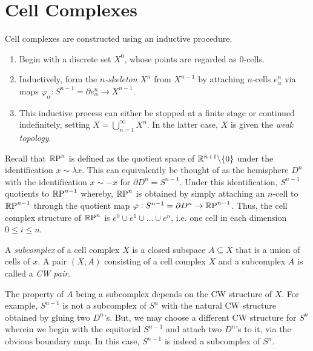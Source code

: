 \section{Cell Complexes}

\begin{definition}
    Cell complexes are constructed using an inductive procedure. 
    \begin{enumerate}[label=(\alph*)]
        \item Begin with a discrete set $X^0$, whose points are regarded as $0$-cells.
        \item Inductively, form the \emph{$n$-skeleton} $X^n$ from $X^{n - 1}$ by attaching $n$-cells $e_\alpha^{n}$ via maps $\varphi_\alpha: S^{n - 1} = \partial e_\alpha^n\to X^{n - 1}$. 
        \item This inductive process can either be stopped at a finite stage or continued indefinitely, setting $X = \bigcup_{n = 1}^\infty X^n$. In the latter case, $X$ is given the \emph{weak topology}.
    \end{enumerate}
\end{definition}

\begin{example}
    Recall that $\mathbb{R}\text{P}^n$ is defined as the quotient space of $\mathbb{R}^{n + 1}\backslash\{0\}$ under the identification $x\sim\lambda x$. This can equivalently be thought of as the hemisphere $D^n$ with the identification $x\sim -x$ for $\partial D^n = S^{n - 1}$. Under this identification, $S^{n - 1}$ quotients to $\mathbb{R}\text{P}^{n - 1}$ whereby, $\mathbb{R}\text{P}^n$ is obtained by simply attaching an $n$-cell to $\mathbb{R}\text{P}^{n - 1}$ through the quotient map $\varphi: S^{n - 1} = \partial D^n\to\mathbb{R}\text{P}^{n - 1}$. Thus, the cell complex structure of $\mathbb{R}\text{P}^n$ is $e^0\cup e^1\cup\dots\cup e^{n}$, i.e. one cell in each dimension $0\le i\le n$.
\end{example}

\begin{example}
    
\end{example}

\begin{definition}
    A \emph{subcomplex} of a cell complex $X$ is a closed subspace $A\subseteq X$ that is a union of cells of $x$. A pair $(X,A)$ consisting of a cell complex $X$ and a subcomplex $A$ is called a \emph{CW pair}.
\end{definition}

\begin{remark}
    The property of $A$ being a subcomplex depends on the CW structure of $X$. For example, $S^{n - 1}$ is not a subcomplex of $S^n$ with the natural CW structure obtained by gluing two $D^n$'s. But, we may choose a different CW structure for $S^n$ wherein we begin with the equitorial $S^{n - 1}$ and attach two $D^n$'s to it, via the obvious boundary map. In this case, $S^{n - 1}$ is indeed a subcomplex of $S^n$.
\end{remark}

